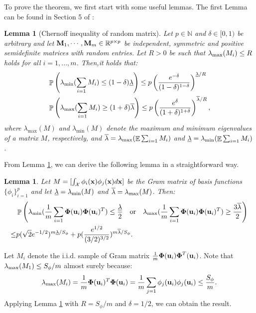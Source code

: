 \documentclass[aos,preprint]{imsart}
\theoremstyle{plain}
\newtheorem{lemma}[theorem]{Lemma}
\DeclareMathOperator{\pr}{\mathbb P}
\DeclareMathOperator{\E}{\mathbb E}
\newcommand{\Real}{\mathbb R}
\newcommand{\NatInt}{\mathbb N}
\newcommand{\CalX}{\mathcal X}
\newcommand{\BFx}{\bold x}
\newcommand{\Bu}{\bold u}
\newcommand{\BPhi}{\boldsymbol{\Phi}}
\theoremstyle{remark}
\begin{document}
\begin{appendix}
To prove the theorem, we first start with some useful lemmas. The first Lemma can be found in Section 5 of \cite{tropp2012user}:

\begin{lemma}[Chernoff inequality of random matrix]
\label{lem:matrix_chernoff}
    Let $p\in\NatInt$ and $\delta\in[0,1)$ be arbitrary and let $\bold{M}_1,\cdots, \bold{M}_m\in\Real^{p\times p}$ be independent, symmetric and positive semidefinite matrices with random entries. Let $R>0$ be such that $\lambda_{\rm max}(M_i)\leq R$ holds for all $i=1,...,m$. Then,it holds that:
    \begin{align*}
        &\pr\left(\lambda_{\rm min}(\sum_{i=1}M_i)\leq (1-\delta)\underline{\lambda}\right)\leq p\left(\frac{e^{-\delta}}{(1-\delta)^{1-\delta}}\right)^{\underline{\lambda}/R}\\
        &\pr\left(\lambda_{\rm max}(\sum_{i=1}M_i)\geq (1+\delta)\overline{\lambda}\right)\leq p\left(\frac{e^{\delta}}{(1+\delta)^{1+\delta}}\right)^{\overline{\lambda}/R},
    \end{align*}
    where $\lambda_{\max}(M)$ and $\lambda_{\min}(M)$ denote the maximum and minimum eigenvalues of a matrix $M$, respectively, and $\overline{\lambda}=\lambda_{\rm max}(\E \sum_{i=1}M_i)$ and $\underline{\lambda}=\lambda_{\rm min}(\E \sum_{i=1}M_i)$.
\end{lemma}

From Lemma \ref{lem:matrix_chernoff}, we can derive the following lemma in a straightforward way.
\begin{lemma}
\label{lem:spectral_empirical_gram}
    Let $M=[\int_{{\CalX}}\phi_i(\BFx)\phi_j(\BFx)d\BFx]$ be the Gram matrix of basis functions $\{\phi_i\}_{i=1}^p$ and let $\underline{\lambda}=\lambda_{\rm min}(M)$ and $\overline{\lambda}=\lambda_{\rm max}(M)$. Then:
    \begin{align}
        &\pr\left(\lambda_{\rm min}(\frac{1}{m}\sum_{i=1}\BPhi(\Bu_i)\BPhi(\Bu_i)^T)\leq \frac{\underline{\lambda}}{2} \quad \textrm{or} \quad \lambda_{\rm max}(\frac{1}{m}\sum_{i=1}\BPhi(\Bu_i)\BPhi(\Bu_i)^T)\geq \frac{3\overline{\lambda}}{2}\right)\nonumber\\
        \leq & p(\sqrt{2}e^{-1/2})^{m\underline{\lambda}/S_\phi}+p(\frac{e^{1/2}}{(3/2)^{3/2}})^{m\overline{\lambda}/S_\phi}. \label{eq:spectral_empirical_gram}
    \end{align}
\end{lemma}
\proof
Let $M_i$ denote the i.i.d. sample of Gram matrix $\frac{1}{m}\BPhi(\Bu_i)\BPhi^T(\Bu_i)$. Note that $\lambda_{\rm max}(M_1)\leq {S_\phi}/{m}$ almost surely because:
\[\lambda_{\rm max}(M_i)=\frac{1}{m}\BPhi(\Bu_i)^T\BPhi(\Bu_i)=\frac{1}{m}\sum_{j=1}\phi_j(\Bu_i)\phi_j(\Bu_i)\leq \frac{S_\phi}{m}.\]
Applying Lemma \ref{lem:matrix_chernoff} with $R=S_\phi/m$ and $\delta=1/2$, we can obtain the result.
\endproof






\end{appendix}
\end{document}
